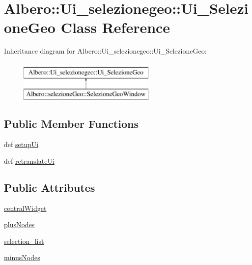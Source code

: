 \hypertarget{classAlbero_1_1Ui__selezionegeo_1_1Ui__SelezioneGeo}{
\section{Albero::Ui\_\-selezionegeo::Ui\_\-SelezioneGeo Class Reference}
\label{classAlbero_1_1Ui__selezionegeo_1_1Ui__SelezioneGeo}
}
Inheritance diagram for Albero::Ui\_\-selezionegeo::Ui\_\-SelezioneGeo:\begin{figure}[H]
\begin{center}
\leavevmode
\includegraphics[height=2.000000cm]{classAlbero_1_1Ui__selezionegeo_1_1Ui__SelezioneGeo}
\end{center}
\end{figure}
\subsection*{Public Member Functions}
\begin{DoxyCompactItemize}
\item 
def \hyperlink{classAlbero_1_1Ui__selezionegeo_1_1Ui__SelezioneGeo_aa1da558a5b29d864cd6dcdca9a54ef5e}{setupUi}
\item 
def \hyperlink{classAlbero_1_1Ui__selezionegeo_1_1Ui__SelezioneGeo_acceb3a027488800b48bd51282c809f6e}{retranslateUi}
\end{DoxyCompactItemize}
\subsection*{Public Attributes}
\begin{DoxyCompactItemize}
\item 
\hyperlink{classAlbero_1_1Ui__selezionegeo_1_1Ui__SelezioneGeo_aa012c288ab65f24487549c604ed02934}{centralWidget}
\item 
\hyperlink{classAlbero_1_1Ui__selezionegeo_1_1Ui__SelezioneGeo_a1806e4986a0b05fc54503c97926774cb}{plusNodes}
\item 
\hyperlink{classAlbero_1_1Ui__selezionegeo_1_1Ui__SelezioneGeo_ac5c9ec8b4e04b3a3536ed1643d79c7a5}{selection\_\-list}
\item 
\hyperlink{classAlbero_1_1Ui__selezionegeo_1_1Ui__SelezioneGeo_ac2ece95860ca3cff5db970d309e346f6}{minusNodes}
\end{DoxyCompactItemize}


